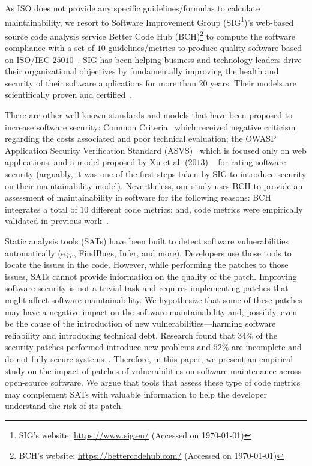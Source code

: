 \documentclass[smallextended]{svjour3}       %
\begin{document}
As ISO does not provide any specific guidelines/formulas to 
calculate maintainability, we resort to Software Improvement Group 
(SIG\footnote{SIG's website: 
\url{https://www.sig.eu/} (Accessed on \today{})})'s web-based source 
code analysis service Better Code Hub (BCH)\footnote{BCH's 
website: \url{https://bettercodehub.com/} (Accessed on \today{})}  
to compute the software compliance with a set of $10$ 
guidelines/metrics to produce quality software based on ISO/IEC 
$25010$~\cite{Visser:2016:OREILLY}. SIG 
has been helping business and technology leaders drive their organizational 
objectives by fundamentally improving the health and security of 
their software applications for more than 20 years. Their 
models are scientifically proven and certified~\cite{4335232,5609747,6113040,baggen2012}.

There are other well-known 
standards and models that have been proposed to increase software 
security: Common Criteria~\cite{common:2009} which received
negative criticism regarding the costs associated and poor technical 
evaluation; the OWASP Application Security Verification 
Standard (ASVS)~\cite{oswap:2009} which is focused only on web 
applications, and a model proposed by Xu et al. ($2013$)
~\cite{6616351} for rating software security (arguably, it was one 
of the first steps taken by SIG to introduce security on their 
maintainability model). Nevertheless, our study uses BCH to provide 
an assessment of maintainability in software for the following 
reasons: BCH integrates a total of $10$ different code metrics; and, 
code metrics were empirically validated in previous 
work~\cite{Bijlsma:2012:FIR:2317098.2317124,8530041,8919169,8785997}.

Static analysis tools (SATs) have been built to detect software 
vulnerabilities automatically (e.g., FindBugs, Infer, and more). Developers
use those tools to locate the issues in the code. However,
while performing the patches to those issues, SATs cannot provide 
information on the quality of the patch. 
Improving software security is not a trivial task and requires 
implementing patches that might affect software maintainability. 
We hypothesize that some of these patches may 
have a negative impact on the software maintainability and, 
possibly, even be the cause of the introduction of new 
vulnerabilities---harming software reliability and introducing 
technical debt. Research found that $34\%$ of the security patches 
performed introduce new problems and $52\%$ are incomplete and do not 
fully secure systems~\cite{10.1145/3133956.3134072}. Therefore, in this paper, 
we present an empirical study on the impact of patches of 
vulnerabilities on software maintenance across open-source software.
We argue that tools that assess these type of code metrics may
complement SATs with valuable information to help the developer
understand the risk of its patch.
\end{document}
